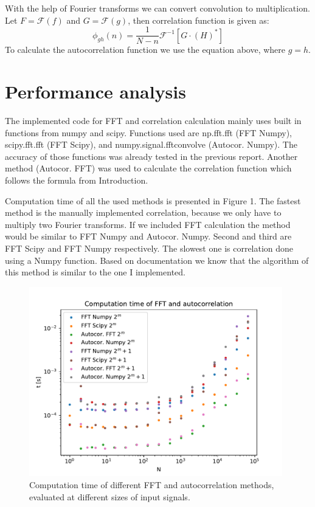 \documentclass[12pt, a4paper]{article}
\begin{document}
With the help of Fourier transforms we can convert convolution to multiplication. Let $F = \mathcal{F}(f)$ and $G = \mathcal{F}(g)$, then correlation function is given as:
\begin{equation*}
  \phi_{gh}(n) = \frac{1}{N-n}\mathcal{F}^{-1} \left[ G \cdot (H)^\ast \right]
\end{equation*}
To calculate the autocorrelation function we use the equation above, where $g = h$.

\section{Performance analysis}
The implemented code for FFT and correlation calculation mainly uses built in functions from {\sc numpy} and {\sc scipy}. Functions used are {\sc np.fft.fft} (FFT Numpy), {\sc scipy.fft.fft} (FFT Scipy), and {\sc numpy.signal.fftconvolve} (Autocor. Numpy). The accuracy of those functions was already tested in the previous report. Another method (Autocor. FFT) was used to calculate the correlation function which follows the formula from Introduction.

Computation time of all the used methods is presented in Figure 1. The fastest method is the manually implemented correlation, because we only have to multiply two Fourier transforms. If we included FFT calculation the method would be similar to FFT Numpy and Autocor. Numpy. Second and third are FFT Scipy and FFT Numpy respectively. The slowest one is correlation done using a Numpy function. Based on documentation we know that the algorithm of this method is similar to the one I implemented.

\begin{figure}[hbtp]
  \begin{center}
  \includegraphics[width=11cm]{graphs/time_FFT_5.pdf}
  \end{center}
  \vspace*{-7mm}
  \caption{Computation time of different FFT and autocorrelation methods, evaluated at different sizes of input signals.}
\end{figure}
\end{document}
